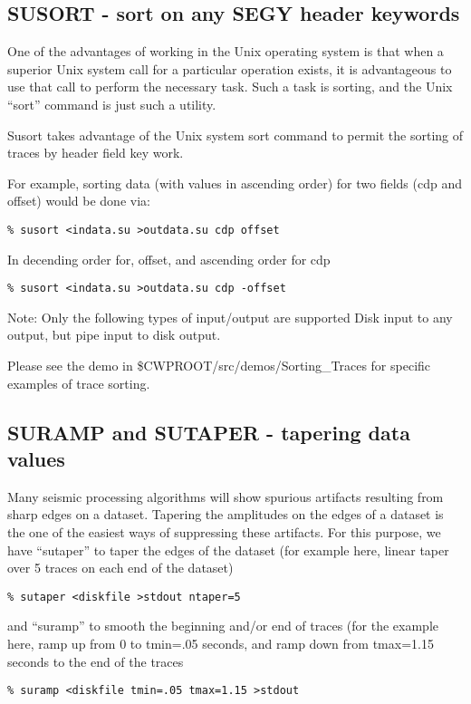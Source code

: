 {{{{{{{\subsection{SUSORT - sort on any SEGY header keywords}

One of the advantages of working in the Unix operating system is
that when a superior Unix system call for a particular operation
exists, it is advantageous to use that call to perform the necessary
task. Such a task is sorting, and the Unix ``sort'' command is
just such a utility.

Susort takes advantage of the Unix system sort command to permit
the sorting of traces by header field key work.

For example, sorting data (with values in ascending order)
for two fields (cdp and offset) would be done via:
{\small\begin{verbatim}
% susort <indata.su >outdata.su cdp offset			
\end{verbatim}} \noindent
In decending order for, offset, and ascending order for cdp
{\small\begin{verbatim}
% susort <indata.su >outdata.su cdp -offset			
\end{verbatim}} \noindent
 Note:	Only the following types of input/output are supported	
Disk input to any output, but  pipe input to disk output.				

Please see the demo in \$CWPROOT/src/demos/Sorting\_Traces
for specific examples of trace sorting.

\subsection{SURAMP and SUTAPER - tapering data values}
Many seismic processing algorithms will show spurious artifacts
resulting from sharp edges on a dataset.  Tapering the amplitudes 
on the edges of a dataset is the one of the easiest ways of 
suppressing these artifacts.
For this purpose, we have  ``sutaper'' to taper the edges of
the dataset (for example here, linear taper over 5 traces on each
end of the dataset)
{\small\begin{verbatim}
% sutaper <diskfile >stdout ntaper=5   
\end{verbatim}} \noindent
and ``suramp'' to smooth the beginning and/or end of traces
(for the example here, ramp up from 0 to tmin=.05 seconds,
and ramp down from tmax=1.15 seconds to the end of the traces
{\small\begin{verbatim}
% suramp <diskfile tmin=.05 tmax=1.15 >stdout 
\end{verbatim}} \noindent

}}}}}}}
